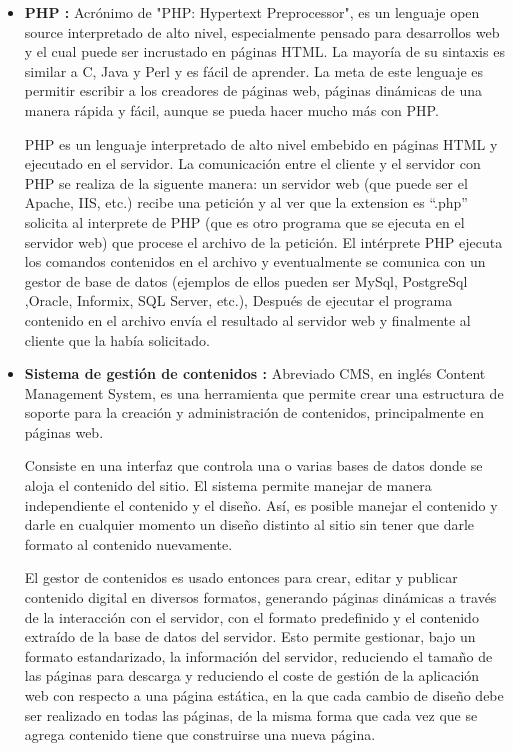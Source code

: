 \documentclass[letterpaper, 11pt, oneside]{article}
\theoremstyle{definition}
\theoremstyle{remark}
\begin{document}
\begin{itemize}
\item \textbf{PHP :} Acrónimo de "PHP: Hypertext Preprocessor", es un lenguaje open source interpretado de alto nivel, especialmente pensado para desarrollos web y el cual puede ser incrustado en páginas HTML. La mayoría de su sintaxis es similar a C, Java y Perl y es fácil de aprender. La meta de este lenguaje es permitir escribir a los creadores de páginas web, páginas dinámicas de una manera rápida y fácil, aunque se pueda hacer mucho más con PHP. \cite{PHP}

PHP es un lenguaje interpretado de alto nivel embebido en páginas HTML y ejecutado en el servidor. La comunicación entre el cliente y el servidor con PHP se realiza de la siguente manera: un servidor web (que puede ser el Apache, IIS, etc.) recibe una petición y al ver que la extension es “.php” solicita al interprete de PHP (que es otro programa que se ejecuta en el servidor web) que procese el archivo de la petición. El intérprete PHP ejecuta los comandos contenidos en el archivo y eventualmente se comunica con un gestor de base de datos (ejemplos de ellos pueden ser MySql, PostgreSql ,Oracle, Informix, SQL Server, etc.), Después de ejecutar el programa contenido en el archivo envía el resultado al servidor web y finalmente al cliente que la había solicitado.

\item \textbf{Sistema de gestión de contenidos :} Abreviado CMS, en inglés Content Management System, es una herramienta que permite crear una estructura de soporte para la creación y administración de contenidos, principalmente en páginas web.

Consiste en una interfaz que controla una o varias bases de datos donde se aloja el contenido del sitio. El sistema permite manejar de manera independiente el contenido y el diseño. Así, es posible manejar el contenido y darle en cualquier momento un diseño distinto al sitio sin tener que darle formato al contenido nuevamente.

El gestor de contenidos es usado entonces para crear, editar y publicar contenido digital en diversos formatos, generando páginas dinámicas a través de la interacción con el servidor, con el formato predefinido y el contenido extraído de la base de datos del servidor. Esto permite gestionar, bajo un formato estandarizado, la información del servidor, reduciendo el tamaño de las páginas para descarga y reduciendo el coste de gestión de la aplicación web con respecto a una página estática, en la que cada cambio de diseño debe ser realizado en todas las páginas, de la misma forma que cada vez que se agrega contenido tiene que construirse una nueva página.


\end{itemize}
\end{document}
